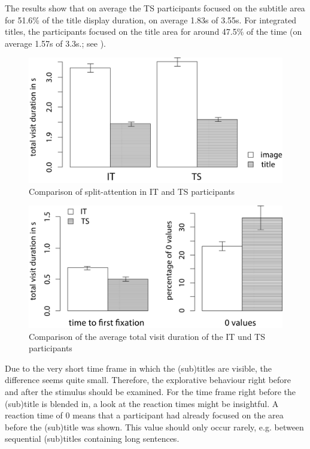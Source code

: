 \documentclass[output=paper]{langsci/langscibook}
\begin{document}
The results show that on average the TS participants focused on the subtitle area for 51.6\% of the title display duration, on average 1.83s of 3.55s. For integrated titles, the participants focused on the title area for around 47.5\% of the time (on average 1.57s of 3.3s.; see ).


\begin{figure} 
  \includegraphics[height=.3\textheight]{figures/Fox7_neu.jpg}
  \caption{Comparison of split-attention in IT and TS participants}
  \label{fox:fig:7}
\end{figure}

\begin{figure} 
  \includegraphics[height=.3\textheight]{figures/Fox8_neu.jpg}
  \caption{Comparison of the average total visit duration of the IT und TS participants}
  \label{fox:fig:8}
\end{figure}


Due to the very short time frame in which the (sub)titles are visible, the difference seems quite small. Therefore, the explorative behaviour right before and after the stimulus should be examined. For the time frame right before the (sub)title is blended in, a look at the reaction times might be insightful. A reaction time of 0 means that a participant had already focused on the area before the (sub)title was shown. This value should only occur rarely, e.g. between sequential (sub)titles containing long sentences.
\end{document}
